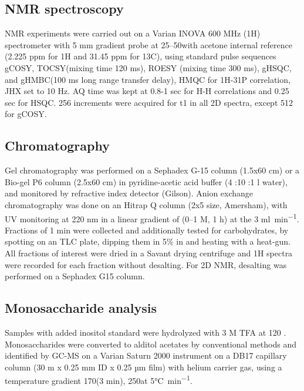 	\subsection{\ac{NMR} spectroscopy} %
	\label{sub:nmr_spectroscopy}

		\ac{NMR} experiments were carried out on a Varian INOVA 600 \si{\mega\hertz} (1H) spectrometer with 5 \si{\milli\meter} gradient probe at 25--50\cel with acetone internal reference (2.225 ppm for 1H and 31.45 ppm for 13C), using standard pulse sequences \ac{gCOSY}, \ac{TOCSY}(mixing time 120 \si{\milli\second}), \ac{ROESY} (mixing time 300 \si{\milli\second}),  \ac{gHSQC}, and  \ac{gHMBC}(100 \si{\milli\second} long range transfer delay), \ac{HMQC} for 1H-31P correlation, JHX set to 10 \si{\hertz}. AQ time was kept at 0.8-1 sec for H-H correlations and 0.25 sec for \ac{HSQC}. 256 increments were acquired for t1 in all 2D spectra, except 512 for \ac{gCOSY}.

	\subsection{Chromatography} %
	\label{sub:chromatography}

		Gel chromatography was performed on a Sephadex G-15 column (1.5x60 cm) or a Bio-gel P6 column (2.5x60 cm) in pyridine-acetic acid buffer (4 \millilitre:10 \millilitre:1 \si{\litre} water), and monitored by refractive index detector (Gilson). Anion exchange chromatography was done on an Hitrap Q column (2x5 \millilitre size, Amersham), with \ac{UV} monitoring at 220 nm in a linear gradient of  (0--1 M, 1 h) at the 3 \si{\milli\litre\per\minute}. Fractions of 1 min were collected and additionally tested for carbohydrates, by spotting on an  \ac{TLC} plate, dipping them in 5\%  in  and heating with a heat-gun. All fractions of interest were dried in a Savant drying centrifuge and 1H spectra were recorded for each fraction without desalting. For 2D \ac{NMR}, desalting was performed on a Sephadex G15 column. 

	\subsection{Monosaccharide analysis} %
	\label{sub:monosaccharide_analysis}

		Samples with added inositol standard were hydrolyzed with 3 M \ac{TFA} at 120 \cel. Monosaccharides were converted to alditol acetates by conventional methods and identified by \ac{GC-MS} on a Varian Saturn 2000 instrument on a DB17 capillary column (30 m x 0.25 \si{\milli\meter} ID x 0.25 µm film) with helium carrier gas, using a temperature gradient 170\cel (3 min), 250\cel at 5\si{\degreeCelsius\per\minute}.

